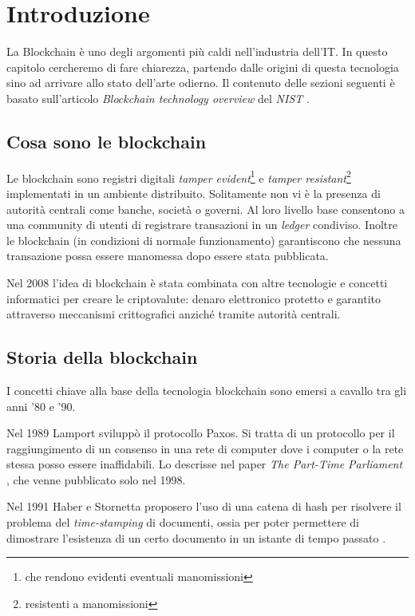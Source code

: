\chapter{Introduzione}

La Blockchain è uno degli argomenti più caldi nell'industria dell'IT. In questo
capitolo cercheremo di fare chiarezza, partendo dalle origini di questa tecnologia
sino ad arrivare allo stato dell'arte odierno.
Il contenuto delle sezioni seguenti è basato sull'articolo
\textit{Blockchain technology overview} del \textit{NIST} \cite{yaga2018blockchain}.

\section{Cosa sono le blockchain}
Le blockchain sono registri digitali
\textit{tamper evident}\footnote{che rendono evidenti eventuali manomissioni}
e \textit{tamper resistant}\footnote{resistenti a manomissioni}
implementati in un ambiente distribuito.
Solitamente non vi è la presenza di autorità centrali come banche, società o governi.
Al loro livello base consentono a una community di utenti di registrare
transazioni in un \textit{ledger} condiviso.
Inoltre le blockchain (in condizioni di normale funzionamento) garantiscono che
nessuna transazione possa essere manomessa dopo essere stata pubblicata.

Nel 2008 l'idea di blockchain
è stata combinata con altre tecnologie e concetti informatici
per creare le criptovalute:
denaro elettronico protetto e garantito attraverso meccanismi crittografici anziché
tramite autorità centrali.

\section{Storia della blockchain}
I concetti chiave alla base della tecnologia blockchain sono emersi a cavallo tra gli anni '80 e '90.

Nel 1989 Lamport sviluppò il protocollo Paxos. Si tratta di
un protocollo per il raggiungimento di un consenso in una rete di computer
dove i computer o la rete stessa posso essere inaffidabili. Lo descrisse nel paper
\textit{The Part-Time Parliament} \cite{lamport1998part},
che venne pubblicato solo nel 1998.

Nel 1991 Haber e Stornetta proposero l'uso di una catena di hash
per risolvere il problema del \textit{time-stamping} di documenti,
ossia per poter permettere di dimostrare l'esistenza di un certo
documento in un istante di tempo passato \cite{haber1990time}.

